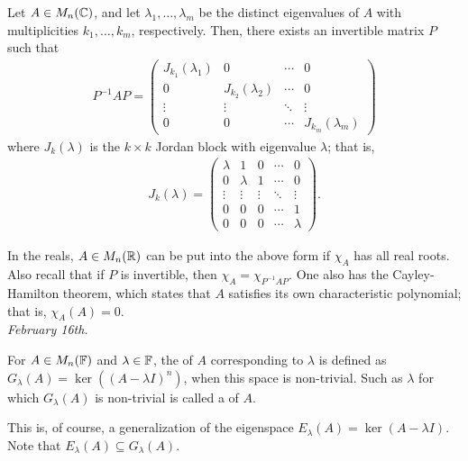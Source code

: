 \begin{theorem}
    Let $A \in M_{n}(\mathbb{C})$, and let $\lambda_{1},\ldots,\lambda_{m}$ be the distinct eigenvalues of $A$ with multiplicities $k_{1},\ldots,k_{m}$, respectively. Then, there exists an invertible matrix $P$ such that
    \begin{align}
        P^{-1} A P = \begin{pmatrix}
            J_{k_{1}}(\lambda_{1}) & 0 & \cdots & 0 \\
            0 & J_{k_{2}}(\lambda_{2}) & \cdots & 0 \\
            \vdots & \vdots & \ddots & \vdots \\
            0 & 0 & \cdots & J_{k_{m}}(\lambda_{m})
        \end{pmatrix}
    \end{align}
    where $J_{k}(\lambda)$ is the $k \times k$ Jordan block with eigenvalue $\lambda$; that is,
    \begin{align}
        J_{k}(\lambda) = \begin{pmatrix}
            \lambda & 1 & 0 & \cdots & 0 \\
            0 & \lambda & 1 & \cdots & 0 \\
            \vdots & \vdots & \vdots & \ddots & \vdots \\
            0 & 0 & 0 & \cdots & 1 \\
            0 & 0 & 0 & \cdots & \lambda
        \end{pmatrix}.
    \end{align} 
\end{theorem}

In the reals, $A \in M_{n}(\mathbb{R})$ can be put into the above form if $\chi_{A}$ has all real roots. Also recall that if $P$ is invertible, then $\chi_{A} = \chi_{P^{-1} A P}$. One also has the Cayley-Hamilton theorem, which states that $A$ satisfies its own characteristic polynomial; that is, $\chi_{A}(A) = 0$.\\

\textit{February 16th.}

\begin{definition}
    For $A \in M_{n}(\mathbb{F})$ and $\lambda \in \mathbb{F}$, the  of $A$ corresponding to $\lambda$ is defined as $G_{\lambda}(A) = \ker((A - \lambda I)^{n})$, when this space is non-trivial. Such as $\lambda$ for which $G_{\lambda}(A)$ is non-trivial is called a  of $A$.
\end{definition}
This is, of course, a generalization of the eigenspace $E_{\lambda}(A) = \ker(A - \lambda I)$. Note that $E_{\lambda}(A) \subseteq G_{\lambda}(A)$.

